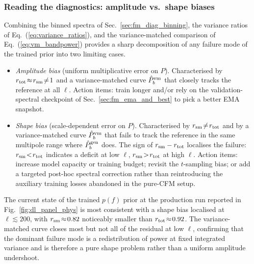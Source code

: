 \documentclass[11pt]{article}
\newcommand{\Var}{\mathrm{Var}}
\newcommand{\dd}{\mathrm{d}}
\DeclareRobustCommand{\xvec}{\bm{x}}
\theoremstyle{definition}
\begin{document}
\subsubsection{Reading the diagnostics: amplitude vs.\ shape biases}

Combining the binned spectra of Sec.~\ref{sec:fm_diag_binning}, the variance ratios of Eq.~(\ref{eq:variance_ratios}), and the variance-matched comparison of Eq.~(\ref{eq:vm_bandpower}) provides a sharp decomposition of any failure mode of the trained prior into two limiting cases.
\begin{itemize}[leftmargin=2.0em,itemsep=0.15em]
  \item \emph{Amplitude bias} (uniform multiplicative error on $P$). Characterised by $r_{\rm tot}\!\approx\!r_{\rm sm}\!\neq\!1$ and a variance-matched curve $\hat P^{\rm vm}_b$ that closely tracks the reference at all $\ell$. Action items: train longer and/or rely on the validation-spectral checkpoint of Sec.~\ref{sec:fm_ema_and_best} to pick a better EMA snapshot.
  \item \emph{Shape bias} (scale-dependent error on $P$). Characterised by $r_{\rm sm}\!\neq\!r_{\rm tot}$ and by a variance-matched curve $\hat P^{\rm vm}_b$ that fails to track the reference in the same multipole range where $\hat P^{\rm gen}_b$ does. The sign of $r_{\rm sm}-r_{\rm tot}$ localises the failure: $r_{\rm sm}\!<\!r_{\rm tot}$ indicates a deficit at low $\ell$, $r_{\rm sm}\!>\!r_{\rm tot}$ at high $\ell$. Action items: increase model capacity or training budget; revisit the $t$-sampling bias; or add a targeted post-hoc spectral correction rather than reintroducing the auxiliary training losses abandoned in the pure-CFM setup.
\end{itemize}
The current state of the trained $p(f)$ prior at the production run reported in Fig.~\ref{fig:dl_panel_phys} is most consistent with a shape bias localised at $\ell\!\lesssim\!200$, with $r_{\rm sm}\!\approx\!0.82$ noticeably smaller than $r_{\rm tot}\!\approx\!0.92$. The variance-matched curve closes most but not all of the residual at low $\ell$, confirming that the dominant failure mode is a redistribution of power at fixed integrated variance and is therefore a pure shape problem rather than a uniform amplitude undershoot.







\end{document}
